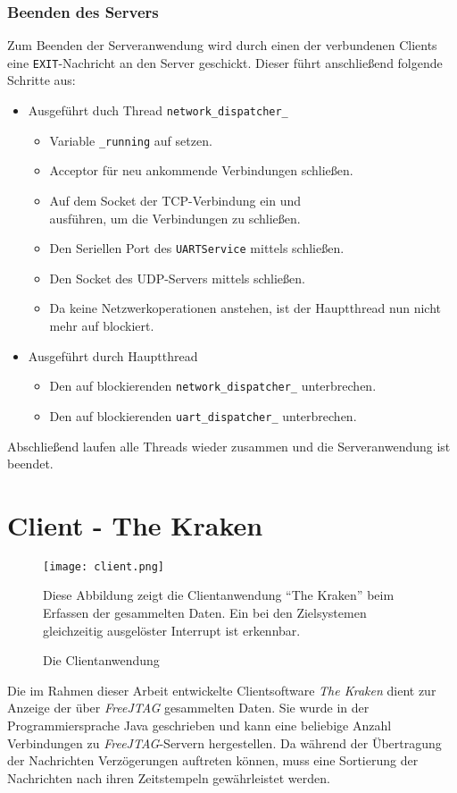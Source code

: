 \subsubsection*{Beenden des Servers}
Zum Beenden der Serveranwendung wird durch einen der verbundenen Clients eine
\texttt{EXIT}-Nachricht an den Server geschickt. Dieser führt anschließend
folgende Schritte aus:
\begin{itemize}
  \item Ausgeführt duch Thread \texttt{network\_dispatcher\_}
  \begin{itemize}
  \item Variable \texttt{\_running} auf  setzen.
  \item Acceptor für neu ankommende Verbindungen schließen.
  \item Auf dem Socket der TCP-Verbindung ein 
  und \\ ausführen, um die Verbindungen zu
  schließen.
  \item Den Seriellen Port des \texttt{UARTService} mittels
   schließen.
  \item Den Socket des UDP-Servers mittels 
  schließen.
  \item Da keine Netzwerkoperationen anstehen, ist der Hauptthread nun nicht
  mehr auf   blockiert.
  \end{itemize}\clearpage
  \item Ausgeführt durch Hauptthread
  \begin{itemize}
    \item Den auf  blockierenden
    \texttt{network\_dispatcher\_} unterbrechen.
    \item Den auf  blockierenden
    \texttt{uart\_dispatcher\_} unterbrechen.
  \end{itemize}
\end{itemize}
Abschließend laufen alle Threads wieder zusammen und die Serveranwendung ist
beendet.

\section{Client - The Kraken}
\begin{figure}[!ht]
\centering
\texttt{[image: client.png]}
\caption{Die Clientanwendung}{Diese Abbildung zeigt die Clientanwendung
"`The Kraken"' beim Erfassen der gesammelten Daten. Ein bei den
Zielsystemen gleichzeitig ausgelöster Interrupt ist erkennbar.}
\label{fig:client}
\end{figure}
Die im Rahmen dieser Arbeit entwickelte Clientsoftware \emph{The Kraken} dient
zur Anzeige der über \emph{FreeJTAG} gesammelten Daten.
Sie wurde in der Programmiersprache Java geschrieben und kann eine beliebige
Anzahl Verbindungen zu \emph{FreeJTAG}-Servern hergestellen. Da während der
Übertragung der Nachrichten Verzögerungen auftreten können, muss eine Sortierung
der Nachrichten nach ihren Zeitstempeln gewährleistet werden.
